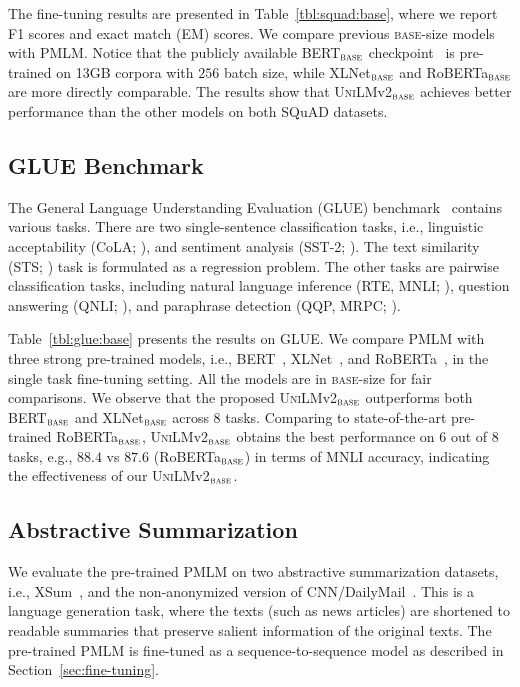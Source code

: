 \documentclass{article}
\newcommand\pmlm{\textsc{PMLM}}
\newcommand{\bertbase}{BERT$_{\textsc{base}}$}
\newcommand{\xlnetbase}{XLNet$_{\textsc{base}}$}
\newcommand{\robertabase}{RoBERTa$_{\textsc{base}}$}
\newcommand{\vtwobase}{\textsc{UniLM}v2$_{\textsc{base}}$}
\begin{document}
The fine-tuning results are presented in Table~\ref{tbl:squad:base}, where we report F1 scores and exact match (EM) scores.
We compare previous \textsc{base}-size models with \pmlm{}.
Notice that the publicly available \bertbase{} checkpoint~\cite{bert} is pre-trained on 13GB corpora with $256$ batch size, while \xlnetbase{} and \robertabase{} are more directly comparable.
The results show that \vtwobase{} achieves better performance than the other models on both SQuAD datasets.


\subsection{GLUE Benchmark}
\label{sec:glue}

The General Language Understanding Evaluation (GLUE) benchmark~\cite{wang2018glue} contains various tasks.
There are two single-sentence classification tasks, i.e., linguistic acceptability (CoLA; \citealt{cola2018}), and sentiment analysis (SST-2; \citealt{sst2013}).
The text similarity (STS; \citealt{sts-b2017}) task is formulated as a regression problem.
The other tasks are pairwise classification tasks, including natural language inference (RTE, MNLI; \citealt{rte1,rte2,rte3,rte5,mnli2017}), question answering (QNLI; \citealt{squad1}), and paraphrase detection (QQP, MRPC; \citealt{mrpc2005}).



Table~\ref{tbl:glue:base} presents the results on GLUE.
We compare \pmlm{} with three strong pre-trained models, i.e., BERT~\cite{bert}, XLNet~\cite{xlnet}, and RoBERTa~\cite{roberta}, in the single task fine-tuning setting.
All the models are in \textsc{base}-size for fair comparisons.
We observe that the proposed \vtwobase{} outperforms both \bertbase{} and \xlnetbase{} across $8$ tasks. Comparing to state-of-the-art pre-trained \robertabase{}, \vtwobase{} obtains the best performance on $6$ out of $8$ tasks, e.g., $88.4$ vs $87.6$ (\robertabase{}) in terms of MNLI accuracy, indicating the effectiveness of our \vtwobase{}. 

\subsection{Abstractive Summarization}

We evaluate the pre-trained \pmlm{} on two abstractive summarization datasets, i.e., XSum~\cite{xsum}, and the non-anonymized version of CNN/DailyMail~\cite{see-2017-get}.
This is a language generation task, where the texts (such as news articles) are shortened to readable summaries that preserve salient information of the original texts.
The pre-trained \pmlm{} is fine-tuned as a sequence-to-sequence model as described in Section~\ref{sec:fine-tuning}.
\end{document}
